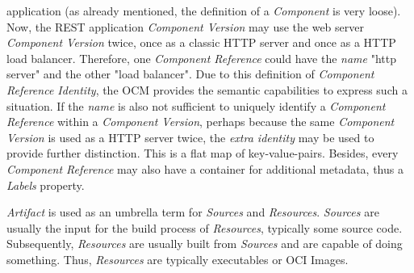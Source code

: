 application (as already mentioned, the definition of a \emph{Component} is very loose). Now, the REST application \emph{Component Version} may use the web server \emph{Component Version} twice, once as a classic HTTP server and once as a HTTP load balancer. Therefore, one \emph{Component Reference} could have the \emph{name} "http server" and the other "load balancer". Due to this definition of \emph{Component Reference Identity}, the OCM provides the semantic capabilities to express such a situation. If the \emph{name} is also not sufficient to uniquely identify a \emph{Component Reference} within a \emph{Component Version}, perhaps because the same \emph{Component Version} is used as a HTTP server twice, the \emph{extra identity} may be used to provide further distinction. This is a flat map of key-value-pairs. Besides, every \emph{Component Reference} may also have a container for additional metadata, thus a \emph{Labels} property.\par 
\noindent \emph{Artifact} is used as an umbrella term for \emph{Sources} and \emph{Resources}. %
\emph{Sources} are usually the input for the build process of \emph{Resources}, typically some source code. Subsequently, \emph{Resources} are usually built from \emph{Sources} and are capable of doing something. Thus, \emph{Resources} are typically executables or OCI Images. %

